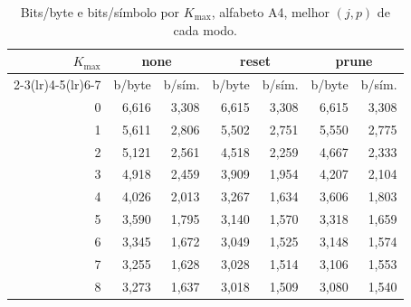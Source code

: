 \begin{table}[H]
\centering
\small
\caption{Bits/byte e bits/s\'imbolo por $K_{\max}$, alfabeto A4, melhor $(j,p)$ de cada modo.}
\label{tab:kmax-A4}
\begin{tabular}{rrrrrrr}
\toprule
$K_{\max}$ & \multicolumn{2}{c}{none} & \multicolumn{2}{c}{reset} & \multicolumn{2}{c}{prune} \\
\cmidrule(lr){2-3}\cmidrule(lr){4-5}\cmidrule(lr){6-7}
 & b/byte & b/s\'im. & b/byte & b/s\'im. & b/byte & b/s\'im. \\
\midrule
0 & 6,616 & 3,308 & 6,615 & 3,308 & 6,615 & 3,308 \\
1 & 5,611 & 2,806 & 5,502 & 2,751 & 5,550 & 2,775 \\
2 & 5,121 & 2,561 & 4,518 & 2,259 & 4,667 & 2,333 \\
3 & 4,918 & 2,459 & 3,909 & 1,954 & 4,207 & 2,104 \\
4 & 4,026 & 2,013 & 3,267 & 1,634 & 3,606 & 1,803 \\
5 & 3,590 & 1,795 & 3,140 & 1,570 & 3,318 & 1,659 \\
6 & 3,345 & 1,672 & 3,049 & 1,525 & 3,148 & 1,574 \\
7 & 3,255 & 1,628 & 3,028 & 1,514 & 3,106 & 1,553 \\
8 & 3,273 & 1,637 & 3,018 & 1,509 & 3,080 & 1,540 \\
\bottomrule
\end{tabular}
\end{table}

